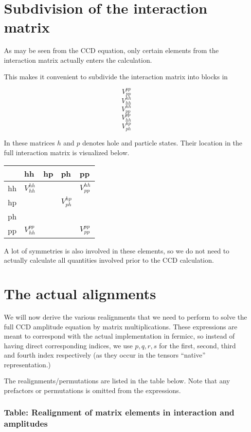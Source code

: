 \documentclass{article}
\begin{document}
    \section{Subdivision of the interaction
matrix}\label{subdivision-of-the-interaction-matrix}

As may be seen from the CCD equation, only certain elements from the
interaction matrix actually enters the calculation.

This makes it convenient to subdivide the interaction matrix into blocks
in

\[V^{pp}_{pp}\] \[V^{hh}_{hh}\] \[V^{hh}_{pp}\] \[V^{pp}_{hh}\]
\[V^{hp}_{ph}\]

In these matrices \(h\) and \(p\) denotes hole and particle states.
Their location in the full interaction matrix is visualized below.

\begin{longtable}[c]{@{}lllll@{}}
\toprule
& hh & hp & ph & pp\tabularnewline
\midrule
\endhead
hh & \(V^{hh}_{hh}\) & & & \(V^{hh}_{pp}\)\tabularnewline
hp & & & \(V^{hp}_{ph}\) &\tabularnewline
ph & & & &\tabularnewline
pp & \(V^{pp}_{hh}\) & & & \(V^{pp}_{pp}\)\tabularnewline
\bottomrule
\end{longtable}

A lot of symmetries is also involved in these elements, so we do not
need to actually calculate all quantities involved prior to the CCD
calculation.

    \section{The actual alignments}\label{the-actual-alignments}

We will now derive the various realignments that we need to perform to
solve the full CCD amplitude equation by matrix multiplications. These
expressions are meant to correspond with the actual implementation in
fermicc, so instead of having direct corresponding indices, we use
\(p,q,r,s\) for the first, second, third and fourth index respectively
(as they occur in the tensors ``native'' representation.)

The realignments/permutations are listed in the table below. Note that
any prefactors or permutations is omitted from the expressions.

    \subsubsection{Table: Realignment of matrix elements in interaction and
amplitudes}\label{table-realignment-of-matrix-elements-in-interaction-and-amplitudes}
\end{document}
